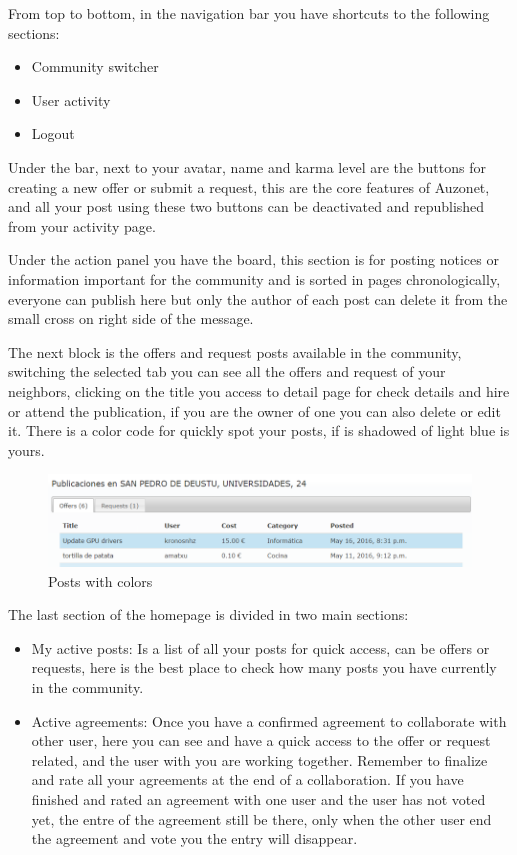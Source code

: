 \documentclass{DeustoFDP}
\begin{document}
From top to bottom, in the navigation bar you have shortcuts to the following sections:
\begin{itemize}
	\item Community switcher
	\item User activity
	\item Logout
\end{itemize}

Under the bar, next to your avatar, name and karma level are the buttons for creating a new offer or submit a request, this are the core features of Auzonet, and all your post using these two buttons can be deactivated and republished from your activity page.

Under the action panel you have the board, this section is for posting notices or information important for the community and is sorted in pages chronologically, everyone can publish here but only the author of each post can delete it from the small cross on right side of the message.

The next block is the offers and request posts available in the community, switching the selected tab you can see all the offers and request of your neighbors, clicking on the title you access to detail page for check details and hire or attend the publication, if you are the owner of one you can also delete or edit it.
There is a color code for quickly spot your posts, if is shadowed of light blue is yours.

\begin{figure}[h!]
\centering
\includegraphics[width=0.9\linewidth]{fig/Manual/colors}
\caption[Posts with colors]{Posts with colors}
\label{fig:colors}
\end{figure}


The last section of the homepage is divided in two main sections:
\begin{itemize}
	\item My active posts: Is a list of all your posts for quick access, can be offers or requests, here is the best place to check how many posts you have currently in the community. 
	\item Active agreements: Once you have a confirmed agreement to collaborate with other user, here you can see and have a quick access to the offer or request related, and the user with you are working together. Remember to finalize and rate all your agreements at the end of a collaboration. If you have finished and rated an agreement with one user and the user has not voted yet, the entre of the agreement still be there, only when the other user end the agreement and vote you the entry will disappear.

\end{itemize}
\newpage
\end{document}
